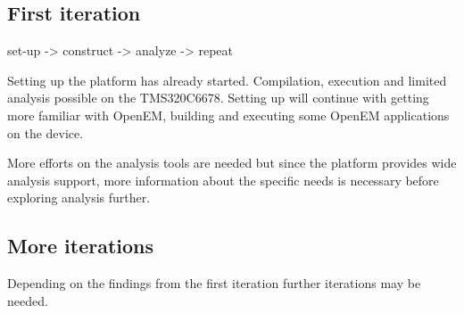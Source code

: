 \subsection{First iteration}
set-up -> construct -> analyze -> repeat

Setting up the platform has already started. Compilation, execution and limited analysis possible on the TMS320C6678. Setting up will continue with getting more familiar with OpenEM, building and executing some OpenEM applications on the device.

More efforts on the analysis tools are needed but since the platform provides wide analysis support, more information about the specific needs is necessary before exploring analysis further.

\subsection{More iterations}
Depending on the findings from the first iteration further iterations may be needed.